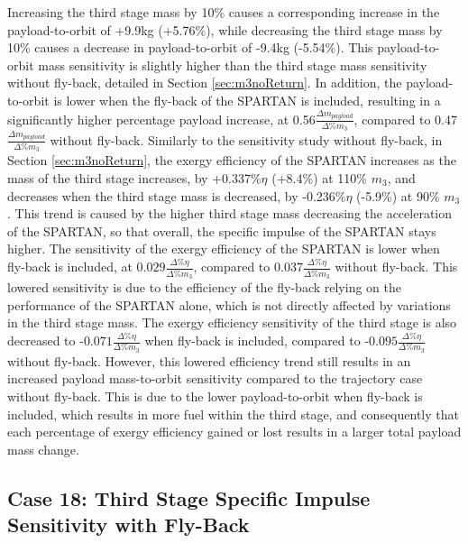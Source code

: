 Increasing the third stage mass by 10\% causes a corresponding increase in the payload-to-orbit of +9.9kg (+5.76\%), while decreasing the third stage mass by 10\% causes a decrease in payload-to-orbit of -9.4kg (-5.54\%). 
This payload-to-orbit mass sensitivity is slightly higher than the third stage mass sensitivity without fly-back, detailed in Section \ref{sec:m3noReturn}. In addition, the payload-to-orbit is lower when the fly-back of the SPARTAN is included, resulting in a significantly higher percentage payload increase, at 0.56$\frac{\Delta m_{payload}}{\Delta\%m_3}$, compared to 0.47$\frac{\Delta m_{payload}}{\Delta\%m_3}$ without fly-back. 
Similarly to the sensitivity study without fly-back, in Section \ref{sec:m3noReturn}, the exergy efficiency of the SPARTAN increases as the mass of the third stage increases, by +0.337\%$\eta$ (+8.4\%) at 110\% $m_3$, and decreases when the third stage mass is decreased, by -0.236\%$\eta$ (-5.9\%) at 90\% $m_3$.
This trend is caused by the higher third stage mass decreasing the acceleration of the SPARTAN, so that overall, the specific impulse of the SPARTAN stays higher. 
The sensitivity of the exergy efficiency of the SPARTAN is lower when fly-back is included, at $0.029\frac{\Delta\%\eta}{\Delta\%m_3}$, compared to $0.037\frac{\Delta\%\eta}{\Delta\%m_3}$ without fly-back. This lowered sensitivity is due to the efficiency of the fly-back relying on the performance of the SPARTAN alone, which is not directly affected by variations in the third stage mass.  
 The exergy efficiency sensitivity of the third stage is also decreased to -$0.071\frac{\Delta\%\eta}{\Delta\%m_3}$ when fly-back is included, compared to -$0.095\frac{\Delta\%\eta}{\Delta\%m_3}$ without fly-back. 
However, this lowered efficiency trend still results in an increased payload mass-to-orbit sensitivity compared to the trajectory case without fly-back. This is due to the lower payload-to-orbit when fly-back is included, which results in more fuel within the third stage, and consequently that each percentage of exergy efficiency gained or lost results in a larger total payload mass change. 

\subsection{Case 18: Third Stage Specific Impulse Sensitivity with Fly-Back}


